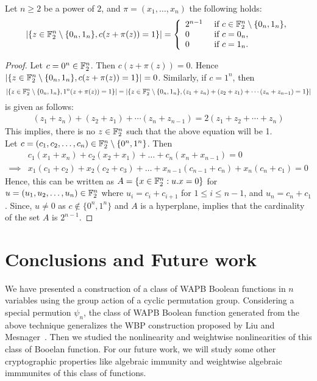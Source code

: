 \documentclass{llncs}
\begin{document}
\begin{proposition}
	Let $n\ge 2$ be a power of $2$, and $\pi= (x_1,\ldots,x_n)$ the following holds:
\[ |\{ z \in \mathbb{F}_2^{n} \setminus \{0_{n},1_{n}\},  c(z+\pi(z))=1   \}| 
= \left \{
\begin{array}{l l}
	2^{n-1}  & \text{ if } c \in \mathbb{F}_2^n \setminus \{0_n,1_n\}, \\
	0  & \text{ if } c=0_n,\\
	0 & \text{ if } c=1_n.
\end{array}\right.\]
	
\end{proposition}
\begin{proof}
	Let $ c = 0^n \in \mathbb{F}_2^n$. Then $c(z + \pi(z))=0$. Hence $|\{ z \in \mathbb{F}_2^{n} \setminus \{0_{n},1_{n}\}, c(z+\pi(z))=1   \}| = 0$. Similarly, if $c = 1^n$, then  $$|\{ z \in \mathbb{F}_2^{n} \setminus \{0_{n},1_{n}\}, 1^n(z+\pi(z))=1   \}| = |\{ z \in \mathbb{F}_2^{n} \setminus \{0_{n},1_{n}\}, (z_1 + z_n)+(z_2 + z_1)+ \cdots (z_n + z_{n-1})= 1 \}|$$ is given as follows:
	\begin{align*}
	(z_1 + z_n)+(z_2 + z_1)+ \cdots (z_n + z_{n-1}) = 2(z_1 + z_2 + \cdots + z_n) 
	\end{align*}
	This implies, there is no $z \in \mathbb{F}_2^n$ such that the above equation will be 1. \\
Let $c=(c_1,c_2,\ldots,c_n) \in \mathbb{F}_2^n \setminus \{0^n,1^n\}$. Then 
\begin{align*}
         & c_1(x_1 + x_n) + c_2(x_2 + x_1) + \ldots + c_n (x_n + x_{n-1})  = 0 \\
\implies &  x_1 ( c_1 + c_2) + x_2 (c_2 + c_3) + \ldots + x_{n-1}(c_{n-1} + c_n) + x_n(c_n + c_1)= 0  
\end{align*}
Hence, this can be written as $A= \{ x \in \mathbb{F}_2^n : u. x = 0\}$ for $ u = (u_1,u_2, \ldots,u_n) \in \mathbb{F}_2^n$ where $ u_i = c_i + c_{i+1}$ for $  1 \leq i \leq {n-1} $, and $u_n = c_n + c_1$. Since, $ u \neq 0 $ as $c \not\in \{0^n,1^n\}$ and $A$ is a hyperplane, implies that the cardinality of the set $A$ is $2^{n-1}$.
\end{proof}
\fi

\section{Conclusions and Future work}
We have presented a construction of a class of WAPB Boolean functions in $n$ variables using the group action of a cyclic permutation group. Considering a special permution $\psi_n$, the class of WAPB Boolean function generated from the above technique generalizes the WBP construction proposed by Liu and Mesnager~\cite{DCC:LiuMes19}. Then we studied the nonlinearity and weightwise
nonlinearities of this class of Booelan function. 
For our future work, we will study some other cryptographic properties like algebraic immunity and weightwise algebraic immmunites of this class of functions.

\ifnum{}
%


\else


	
	
\end{document}
